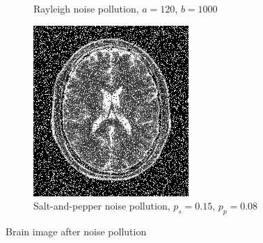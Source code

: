 \documentclass[UTF8]{ctexart}
\begin{document}
\begin{figure}[htbp]
\begin{subfigure}{0.3\textwidth}
        \caption{Rayleigh noise pollution, $a=120$, $b=1000$}
    \end{subfigure}%
    \hfill
    \begin{subfigure}{0.3\textwidth}
        \centering
        \includegraphics[width=\linewidth]{brain_noised_s_p.png}
        \caption{Salt-and-pepper noise pollution, $p_s=0.15$, $p_p=0.08$}
    \end{subfigure}
    \caption{Brain image after noise pollution}
    \label{fig:brain}
\end{figure}
\end{document}
